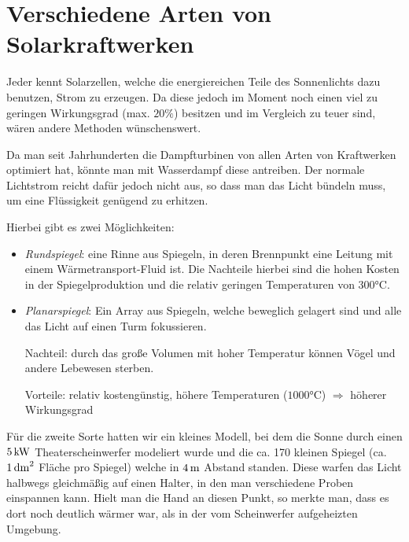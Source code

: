 \documentclass[12pt,a4paper,titlepage,headinclude,bibtotoc]{scrartcl}
\begin{document}
\section{Verschiedene Arten von Solarkraftwerken}
Jeder kennt Solarzellen, welche die energiereichen Teile des Sonnenlichts dazu benutzen, Strom zu erzeugen.
Da diese jedoch im Moment noch einen viel zu geringen Wirkungsgrad (max. $20\%$) besitzen und im Vergleich zu teuer sind, wären andere Methoden wünschenswert.

Da man seit Jahrhunderten die Dampfturbinen von allen Arten von Kraftwerken optimiert hat, könnte man mit Wasserdampf diese antreiben.
Der normale Lichtstrom reicht dafür jedoch nicht aus, so dass man das Licht bündeln muss, um eine Flüssigkeit genügend zu erhitzen.

Hierbei gibt es zwei Möglichkeiten:
\begin{itemize}
	\item \textit{Rundspiegel}: eine Rinne aus Spiegeln, in deren Brennpunkt eine Leitung mit einem Wärmetransport-Fluid ist.
		Die Nachteile hierbei sind die hohen Kosten in der Spiegelproduktion und die relativ geringen Temperaturen von $300\si\celsius$.
	\item \textit{Planarspiegel}: Ein Array aus Spiegeln, welche beweglich gelagert sind und alle das Licht auf einen Turm fokussieren.

		Nachteil: durch das große Volumen mit hoher Temperatur können Vögel und andere Lebewesen sterben.
		
		Vorteile: relativ kostengünstig, höhere Temperaturen ($1000\si\celsius$) $\Rightarrow$ höherer Wirkungsgrad
\end{itemize}

Für die zweite Sorte hatten wir ein kleines Modell, bei dem die Sonne durch einen $\SI5{\kilo\watt}$ Theaterscheinwerfer modeliert wurde und die ca. 170 kleinen Spiegel (ca. $\SI1{\deci\meter\squared}$ Fläche pro Spiegel) welche in $\SI4\meter$ Abstand standen.
Diese warfen das Licht halbwegs gleichmäßig auf einen Halter, in den man verschiedene Proben einspannen kann.
Hielt man die Hand an diesen Punkt, so merkte man, dass es dort noch deutlich wärmer war, als in der vom Scheinwerfer aufgeheizten Umgebung.
\end{document}
